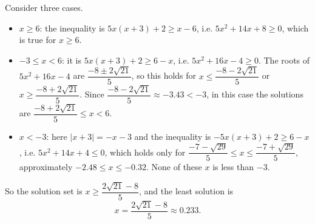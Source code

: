 Consider three cases.
\begin{itemize}
\item $x\ge6$: the inequality is $5x(x+3)+2\ge x-6$, i.e. $5x^2+14x+8\ge0$, which is true for $x\ge6$.
\item $-3\le x<6$: it is $5x(x+3)+2\ge6-x$, i.e. $5x^2+16x-4\ge0$. The roots of $5x^2+16x-4$ are $\dfrac{-8\pm2\sqrt{21}}{5}$, so this holds for $x\le\dfrac{-8-2\sqrt{21}}{5}$ or $x\ge\dfrac{-8+2\sqrt{21}}{5}$. Since $\dfrac{-8-2\sqrt{21}}{5}\approx-3.43<-3$, in this case the solutions are $\dfrac{-8+2\sqrt{21}}{5}\le x<6$.
\item $x<-3$: here $|x+3|=-x-3$ and the inequality is $-5x(x+3)+2\ge6-x$, i.e. $5x^2+14x+4\le0$, which holds only for $\dfrac{-7-\sqrt{29}}{5}\le x\le\dfrac{-7+\sqrt{29}}{5}$, approximately $-2.48\le x\le-0.32$. None of these $x$ is less than $-3$.
\end{itemize}
So the solution set is $x\ge\dfrac{2\sqrt{21}-8}{5}$, and the least solution is
\[\boxed{x=\dfrac{2\sqrt{21}-8}{5}}\approx0.233.\]
